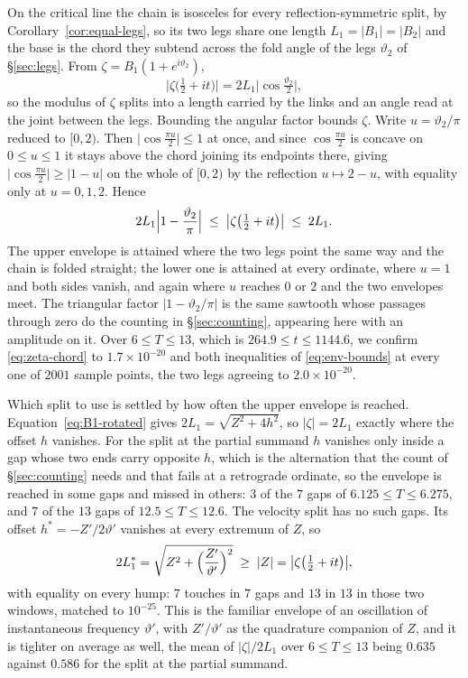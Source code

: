 \documentclass[11pt]{article}
\theoremstyle{definition}
\begin{document}
On the critical line the chain is isosceles for every reflection-symmetric
split, by Corollary~\ref{cor:equal-legs}, so its two legs share one length
$L_1=|B_1|=|B_2|$ and the base is the chord they subtend across the fold
angle of the legs $\vartheta_2$ of \S\ref{sec:legs}. From $\zeta=B_1(1+e^{i\vartheta_2})$,
\begin{equation}\label{eq:zeta-chord}
\bigl|\zeta\bigl(\tfrac12+it\bigr)\bigr|
=2L_1\bigl|\cos\tfrac{\vartheta_2}{2}\bigr| ,
\end{equation}
so the modulus of $\zeta$ splits into a length carried by the links and an angle
read at the joint between the legs. Bounding the angular factor bounds $\zeta$.
Write $u=\vartheta_2/\pi$ reduced to $[0,2)$. Then
$\bigl|\cos\tfrac{\pi u}{2}\bigr|\leq1$ at once, and since
$\cos\tfrac{\pi u}{2}$ is concave on $0\leq u\leq1$ it stays above the chord
joining its endpoints there, giving
$\bigl|\cos\tfrac{\pi u}{2}\bigr|\geq|1-u|$ on the whole of $[0,2)$ by the
reflection $u\mapsto2-u$, with equality only at $u=0,1,2$. Hence
\begin{equation}\label{eq:env-bounds}
2L_1\Bigl|1-\frac{\vartheta_2}{\pi}\Bigr|
\;\leq\;\bigl|\zeta\bigl(\tfrac12+it\bigr)\bigr|\;\leq\;2L_1 .
\end{equation}
The upper envelope is attained where the two legs point the same way and the
chain is folded straight; the lower one is attained at every ordinate, where
$u=1$ and both sides vanish, and again where $u$ reaches $0$ or $2$ and the two
envelopes meet. The triangular factor $|1-\vartheta_2/\pi|$ is the same sawtooth
whose passages through zero do the counting in \S\ref{sec:counting}, appearing
here with an amplitude on it. Over $6\leq T\leq13$, which is
$264.9\leq t\leq1144.6$, we confirm \eqref{eq:zeta-chord} to
$1.7\times10^{-20}$ and both inequalities of \eqref{eq:env-bounds} at every one
of $2001$ sample points, the two legs agreeing to $2.0\times10^{-20}$.

Which split to use is settled by how often the upper envelope is reached.
Equation~\eqref{eq:B1-rotated} gives $2L_1=\sqrt{Z^2+4h^2}$, so $|\zeta|=2L_1$
exactly where the offset $h$ vanishes. For the split at the partial
summand $h$ vanishes only inside a gap whose two ends carry opposite $h$, which
is the alternation that the count of \S\ref{sec:counting} needs and that fails at
a retrograde ordinate, so the envelope is reached in some gaps and missed in
others: $3$ of the $7$ gaps of $6.125\leq T\leq6.275$, and $7$ of the $13$ gaps
of $12.5\leq T\leq12.6$. The velocity split has no such gaps. Its offset
$h^{\ast}=-Z'/2\vartheta'$ vanishes at every extremum of $Z$, so
\begin{equation}\label{eq:env-star}
2L_1^{\ast}=\sqrt{Z^2+\Bigl(\frac{Z'}{\vartheta'}\Bigr)^{2}}
\;\geq\;|Z|=\bigl|\zeta\bigl(\tfrac12+it\bigr)\bigr| ,
\end{equation}
with equality on every hump: $7$ touches in $7$ gaps and $13$ in $13$ in those
two windows, matched to $10^{-25}$. This is the familiar envelope of an
oscillation of instantaneous frequency $\vartheta'$, with $Z'/\vartheta'$ as the
quadrature companion of $Z$, and it is tighter on average as well, the mean of
$|\zeta|/2L_1$ over $6\leq T\leq13$ being $0.635$ against $0.586$ for the split
at the partial summand.
\end{document}
